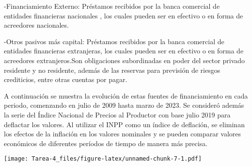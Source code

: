 \documentclass[
  12pt,
]{article}
\begin{document}
-Financiamiento Externo: Préstamos recibidos por la banca comercial de
entidades financieras nacionales , los cuales pueden ser en efectivo o
en forma de acreedores nacionales.

-Otros pasivos más capital: Préstamos recibidos por la banca comercial
de entidades financieras extranjeras, los cuales pueden ser en efectivo
o en forma de acreedores extranjeros.Son obligaciones subordinadas en
poder del sector privado residente y no residente, además de las
reservas para previsión de riesgos crediticios, entre otras cuentas por
pagar.

A continuación se muestra la evolución de estas fuentes de
financiamiento en cada periodo, comenzando en julio de 2009 hasta marzo
de 2023. Se consideró además la serie del Índice Nacional de Precios al
Productor con base julio 2019 para deflactar los valores. Al utilizar el
INPP como un índice de deflación, se eliminan los efectos de la
inflación en los valores nominales y se pueden comparar valores
económicos de diferentes períodos de tiempo de manera más precisa.

\texttt{[image: Tarea-4\_files/figure-latex/unnamed-chunk-7-1.pdf]}
\end{document}
